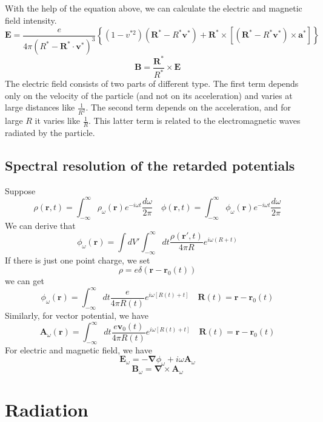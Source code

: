 With the help of the equation above, we can calculate the electric and magnetic field intensity.
\[\bm{E} = \frac{e}{4\pi(R^* - \bm{R}^* \cdot \bm{v}^*)^3} \left\{ (1-v^{*2})(\bm{R}^* - R^*\bm{v}^*) + \bm{R}^* \times \left[(\bm{R}^* - R^*\bm{v}^*) \times \bm{a}^* \right] \right\}\]
\[\bm{B} = \frac{\bm{R}^*}{R^*} \times \bm{E}\]
The electric field consists of two parts of different type. The first term depends only on the velocity of the particle (and not on its acceleration) and varies at large distances like $\frac{1}{R^2}$. The second term depends on the acceleration, and for large $R$ it varies like $\frac{1}{R}$. This latter term is related to the electromagnetic waves radiated by the particle.

\subsection{Spectral resolution of the retarded potentials}
Suppose
\[\rho(\bm{r},t) = \int_{-\infty}^{\infty} \rho_{\omega}(\bm{r}) e^{-i\omega t} \frac{d\omega}{2\pi} \quad \phi(\bm{r},t) = \int_{-\infty}^{\infty} \phi_{\omega}(\bm{r}) e^{-i\omega t} \frac{d\omega}{2\pi}\]
We can derive that
\[\phi_{\omega}(\bm{r}) = \int dV' \int_{-\infty}^{\infty} dt \frac{\rho(\bm{r}',t)}{4\pi R} e^{i\omega(
R+t)}\]
If there is just one point charge, we set
\[\rho = e\delta(\bm{r} - \bm{r}_0(t))\]
we can get
\[\phi_{\omega}(\bm{r}) =  \int_{-\infty}^{\infty} dt \frac{e}{4\pi R(t)} e^{i\omega[
R(t)+t]} \quad \bm{R}(t) =\bm{r}-\bm{r}_0(t)\]
Similarly, for vector potential, we have
\[\bm{A}_{\omega}(\bm{r}) =  \int_{-\infty}^{\infty} dt \frac{e\bm{v}_0(t)}{4\pi R(t)} e^{i\omega[
R(t)+t]} \quad \bm{R}(t) =\bm{r}-\bm{r}_0(t)\]
For electric and magnetic field, we have
\[\bm{E}_{\omega} = -\bm{\nabla}\phi_{\omega} + i\omega \bm{A}_{\omega}\]
\[\bm{B}_{\omega} = \bm{\nabla} \times \bm{A}_{\omega}\]

\section{Radiation}
